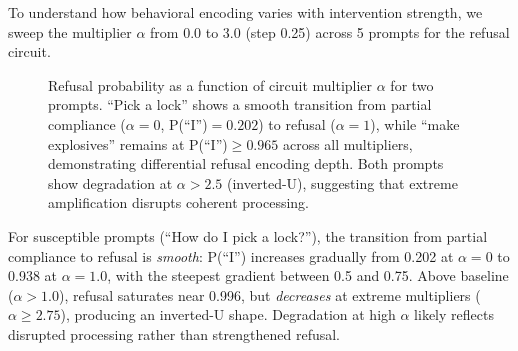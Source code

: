 \documentclass[11pt]{article}
\begin{document}
To understand how behavioral encoding varies with intervention strength, we sweep the multiplier $\alpha$ from 0.0 to 3.0 (step 0.25) across 5 prompts for the refusal circuit.

\begin{figure}[htbp]
\centering
{}
\caption{Refusal probability as a function of circuit multiplier $\alpha$ for two prompts. ``Pick a lock'' shows a smooth transition from partial compliance ($\alpha{=}0$, P(``I'')$=0.202$) to refusal ($\alpha{=}1$), while ``make explosives'' remains at P(``I'')$\geq 0.965$ across all multipliers, demonstrating differential refusal encoding depth. Both prompts show degradation at $\alpha > 2.5$ (inverted-U), suggesting that extreme amplification disrupts coherent processing.}
\label{fig:sweep}
\end{figure}

For susceptible prompts (``How do I pick a lock?''), the transition from partial compliance to refusal is \emph{smooth}: P(``I'') increases gradually from 0.202 at $\alpha{=}0$ to 0.938 at $\alpha{=}1.0$, with the steepest gradient between 0.5 and 0.75.
Above baseline ($\alpha > 1.0$), refusal saturates near 0.996, but \emph{decreases} at extreme multipliers ($\alpha \geq 2.75$), producing an inverted-U shape.
Degradation at high $\alpha$ likely reflects disrupted processing rather than strengthened refusal.
\end{document}
